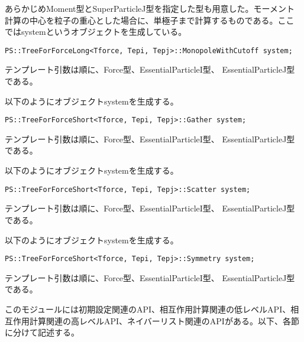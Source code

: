 あらかじめMoment型とSuperParticleJ型を指定した型も用意した。モーメント
計算の中心を粒子の重心とした場合に、単極子まで計算するものである。ここ
ではsystemというオブジェクトを生成している。

\begin{screen}
\begin{verbatim}
PS::TreeForForceLong<Tforce, Tepi, Tepj>::MonopoleWithCutoff system;
\end{verbatim}
\end{screen}
テンプレート引数は順に、Force型、EssentialParticleI型、
EssentialParticleJ型である。


以下のようにオブジェクトsystemを生成する。
\begin{screen}
\begin{verbatim}
PS::TreeForForceShort<Tforce, Tepi, Tepj>::Gather system;
\end{verbatim}
\end{screen}
テンプレート引数は順に、Force型、EssentialParticleI型、
EssentialParticleJ型である。


以下のようにオブジェクトsystemを生成する。
\begin{screen}
\begin{verbatim}
PS::TreeForForceShort<Tforce, Tepi, Tepj>::Scatter system;
\end{verbatim}
\end{screen}
テンプレート引数は順に、Force型、EssentialParticleI型、
EssentialParticleJ型である。


以下のようにオブジェクトsystemを生成する。
\begin{screen}
\begin{verbatim}
PS::TreeForForceShort<Tforce, Tepi, Tepj>::Symmetry system;
\end{verbatim}
\end{screen}
テンプレート引数は順に、Force型、EssentialParticleI型、
EssentialParticleJ型である。


このモジュールには初期設定関連のAPI、相互作用計算関連の低レベルAPI、相
互作用計算関連の高レベルAPI、ネイバーリスト関連のAPIがある。以下、各節
に分けて記述する。


